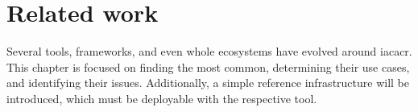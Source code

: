 \chapter{Related work}



Several tools, frameworks, and even whole ecosystems have evolved around \gls{iacacr}. This chapter is focused on finding the most common, determining their use cases, and identifying their issues.
Additionally, a simple reference infrastructure will be introduced, which must be deployable with the respective tool.


